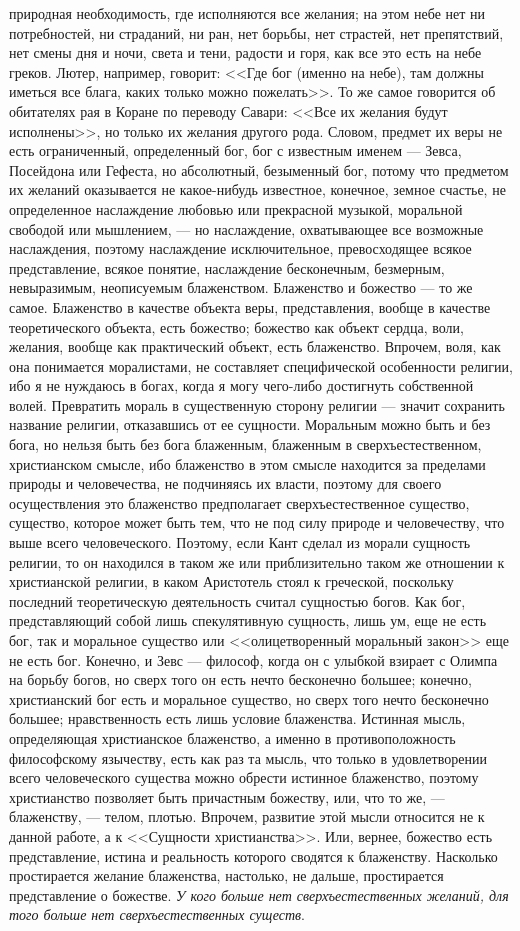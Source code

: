 \documentclass[12pt]{article}
\begin{document}
природная необходимость, где исполняются все желания; на этом небе нет ни потребностей, ни страданий, ни ран, нет борьбы, нет страстей, нет препятствий, нет смены дня и ночи, света и тени, радости и горя, как все это есть на небе греков. Лютер, например, говорит: <<Где бог (именно на небе), там должны иметься все блага, каких только можно пожелать>>. То же самое говорится об обитателях рая в Коране по переводу Савари: <<Все их желания будут исполнены>>, но только их желания другого рода. Словом, предмет их веры не есть ограниченный, определенный бог, бог с известным именем --- Зевса, Посейдона или Гефеста, но абсолютный, безыменный бог, потому что предметом их желаний оказывается не какое-нибудь известное, конечное, земное счастье, не определенное наслаждение любовью или прекрасной музыкой, моральной свободой или мышлением, --- но наслаждение, охватывающее все возможные наслаждения, поэтому наслаждение исключительное, превосходящее всякое представление, всякое понятие, наслаждение бесконечным, безмерным, невыразимым, неописуемым блаженством. Блаженство и божество --- то же самое. Блаженство в качестве объекта веры, представления, вообще в качестве теоретического объекта, есть божество; божество как объект сердца, воли, желания, вообще как практический объект, есть блаженство. Впрочем, воля, как она понимается моралистами, не составляет специфической особенности религии, ибо я не нуждаюсь в богах, когда я могу чего-либо достигнуть собственной волей. Превратить мораль в существенную сторону религии --- значит сохранить название религии, отказавшись от ее сущности. Моральным можно быть и без бога, но нельзя быть без бога блаженным, блаженным в сверхъестественном, христианском смысле, ибо блаженство в этом смысле находится за пределами природы и человечества, не подчиняясь их власти, поэтому для своего осуществления это блаженство предполагает сверхъестественное существо, существо, которое может быть тем, что не под силу природе и человечеству, что выше всего человеческого. Поэтому, если Кант сделал из морали сущность религии, то он находился в таком же или приблизительно таком же отношении к христианской религии, в каком Аристотель стоял к греческой, поскольку последний теоретическую деятельность считал сущностью богов. Как бог, представляющий собой лишь спекулятивную сущность, лишь ум, еще не есть бог, так и моральное существо или <<олицетворенный моральный закон>> еще не есть бог. Конечно, и Зевс --- философ, когда он с улыбкой взирает с Олимпа на борьбу богов, но сверх того он есть нечто бесконечно большее; конечно, христианский бог есть и моральное существо, но сверх того нечто бесконечно большее; нравственность есть лишь условие блаженства. Истинная мысль, определяющая христианское блаженство, а именно в противоположность философскому язычеству, есть как раз та мысль, что только в удовлетворении всего человеческого существа можно обрести истинное блаженство, поэтому христианство позволяет быть причастным божеству, или, что то же, --- блаженству, --- телом, плотью. Впрочем, развитие этой мысли относится не к данной работе, а к <<Сущности христианства>>. Или, вернее, божество есть представление, истина и реальность которого сводятся к блаженству. Насколько простирается желание блаженства, настолько, не дальше, простирается представление о божестве. \emph{У кого больше нет сверхъестественных желаний, для того больше нет сверхъестественных существ}.
\end{document}
